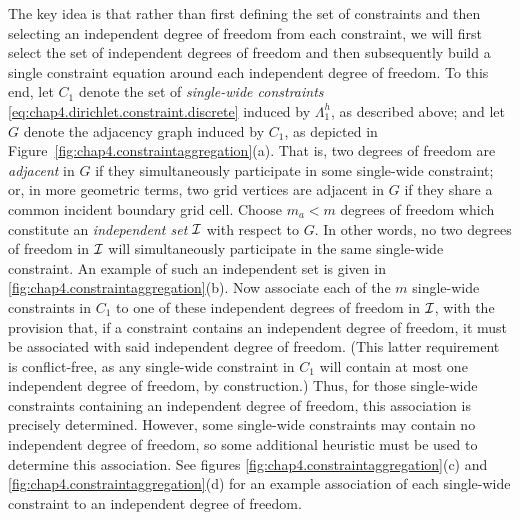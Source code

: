 The key idea is that rather than first defining the set of constraints and then selecting an independent degree of freedom from each constraint, we will first select the set of independent degrees of freedom and then subsequently build a single constraint equation around each independent degree of freedom. To this end, let $C_1$ denote the set of \emph{single-wide constraints} \eqref{eq:chap4.dirichlet.constraint.discrete} induced by $\Lambda^h_1$, as described above; and let $G$ denote the adjacency graph induced by $C_1$, as depicted in Figure~\ref{fig:chap4.constraintaggregation}(a). That is, two degrees of freedom are \emph{adjacent} in $G$ if they simultaneously participate in some single-wide constraint; or, in more geometric terms, two grid vertices are adjacent in $G$ if they share a common incident boundary grid cell. Choose $m_a < m$ degrees of freedom which constitute an \emph{independent set} $\mathcal{I}$ with respect to $G$. In other words, no two degrees of freedom in $\mathcal{I}$ will simultaneously participate in the same single-wide constraint. An example of such an independent set is given in \ref{fig:chap4.constraintaggregation}(b). Now associate each of the $m$ single-wide constraints in $C_1$ to one of these independent degrees of freedom in $\mathcal{I}$, with the provision that, if a constraint contains an independent degree of freedom, it must be associated with said independent degree of freedom. (This latter requirement is conflict-free, as any single-wide constraint in $C_1$ will contain at most one independent degree of freedom, by construction.) Thus, for those single-wide constraints containing an independent degree of freedom, this association is precisely determined. However, some single-wide constraints may contain no independent degree of freedom, so some additional heuristic must be used to determine this association. See figures \ref{fig:chap4.constraintaggregation}(c) and \ref{fig:chap4.constraintaggregation}(d) for an example association of each single-wide constraint to an independent degree of freedom.


